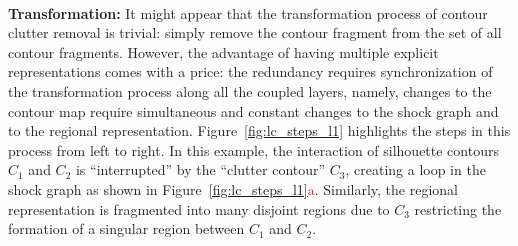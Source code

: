 




\noindent\\
{\bf Transformation:} It might appear that the transformation process of contour clutter removal is trivial: simply remove the contour fragment from the set of all contour fragments. However, the advantage of having multiple explicit representations comes with a price: the redundancy requires synchronization of the transformation process along all the coupled layers, namely, changes to the contour map require simultaneous and constant changes to the shock graph and to the regional representation. Figure~\ref{fig:lc_steps_l1} highlights the steps in this process from left to right. In this example, the interaction of silhouette contours $C_1$ and $C_2$ is ``interrupted'' by the ``clutter contour'' $C_3$, creating a loop in the shock graph as shown in Figure~\ref{fig:lc_steps_l1}\textcolor{red}{a}. Similarly, the regional representation is fragmented into many disjoint regions due to $C_3$ restricting the formation of a singular region between $C_1$ and $C_2$. 





